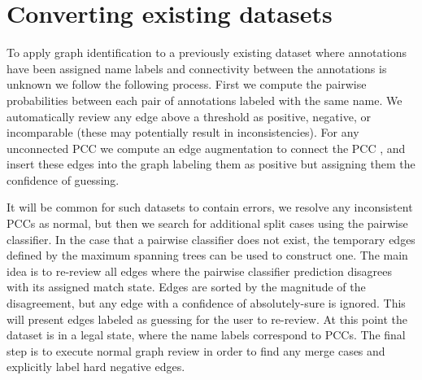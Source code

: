 

\section{Converting existing datasets}\label{sec:rename}
To apply graph identification to a previously existing dataset where annotations have been assigned name labels and
connectivity between the annotations is unknown we follow the following process. First we compute the pairwise
probabilities between each pair of annotations labeled with the same name. We automatically review any edge above a
threshold as positive, negative, or incomparable (these may potentially result in inconsistencies). For any unconnected
PCC we compute an edge augmentation to connect the PCC \cite{eswaran_augmentation_1976,khuller_approximation_1993}, and
insert these edges into the graph labeling them as positive but assigning them the confidence of guessing.

It will be common for such datasets to contain errors, we resolve any inconsistent PCCs as normal, but then we search
for additional split cases using the pairwise classifier. In the case that a pairwise classifier does not exist, the
temporary edges defined by the maximum spanning trees can be used to construct one. The main idea is to re-review all
edges where the pairwise classifier prediction disagrees with its assigned match state. Edges are sorted by the
magnitude of the disagreement, but any edge with a confidence of absolutely-sure is ignored. This will present edges
labeled as guessing for the user to re-review. At this point the dataset is in a legal state, where the name labels
correspond to PCCs. The final step is to execute normal graph review in order to find any merge cases and explicitly
label hard negative edges.

